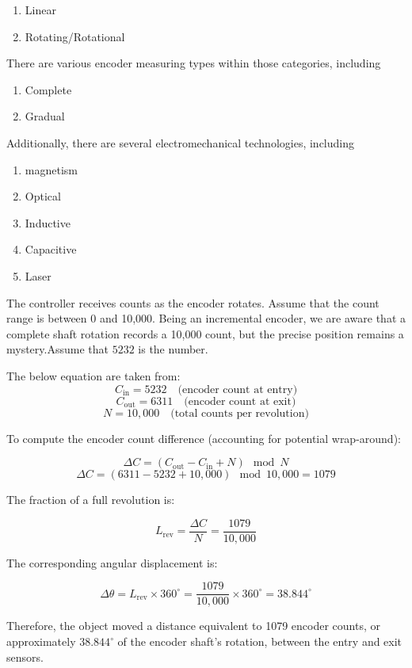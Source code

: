 \documentclass[12pt]{article}
\begin{document}
\begin{enumerate}
    \item  Linear
    \item Rotating/Rotational
    
\end{enumerate}

There are various encoder measuring types within those categories, including
\begin{enumerate}
    \item Complete
    \item Gradual
\end{enumerate}
Additionally, there are several electromechanical technologies, including
\begin{enumerate}
    \item magnetism
    \item Optical
    \item Inductive
    \item Capacitive
    \item Laser 
\end{enumerate}

The controller receives counts as the encoder rotates. Assume that the count range is between 0 and 10,000. Being an incremental encoder, we are aware that a complete shaft rotation records a 10,000 count, but the precise position remains a mystery.Assume that $5232$ is the number\cite{ref27}.

The below equation are taken from: \cite{ref27}
\[
C_{\text{in}} = 5232 \quad \text{(encoder count at entry)}
\]
\[
C_{\text{out}} = 6311 \quad \text{(encoder count at exit)}
\]
\[
N = 10{,}000 \quad \text{(total counts per revolution)} 
\]

To compute the encoder count difference (accounting for potential wrap-around):

\[
\Delta C = (C_{\text{out}} - C_{\text{in}} + N) \mod N 
\]
\[
\Delta C = (6311 - 5232 + 10{,}000) \mod 10{,}000 = 1079 
\]

The fraction of a full revolution is:

\[
L_{\text{rev}} = \frac{\Delta C}{N} = \frac{1079}{10{,}000} 
\]

The corresponding angular displacement is:

\[
\Delta \theta = L_{\text{rev}} \times 360^\circ = \frac{1079}{10{,}000} \times 360^\circ = 38.844^\circ 
\]

\noindent
Therefore, the object moved a distance equivalent to 1079 encoder counts, or approximately $38.844^\circ$ of the encoder shaft's rotation, between the entry and exit sensors\cite{ref27}.\\
\end{document}

